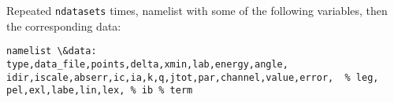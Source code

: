\documentclass[11pt]{article}
\begin{document}
%
%



Repeated {\tt ndatasets} times, namelist with some of the following variables, then the
corresponding data:
\begin{verbatim}
namelist \&data:
type,data_file,points,delta,xmin,lab,energy,angle,
idir,iscale,abserr,ic,ia,k,q,jtot,par,channel,value,error,  % leg,
pel,exl,labe,lin,lex, % ib % term
\end{verbatim}
\end{document}
